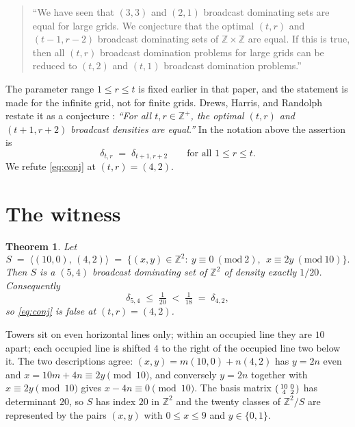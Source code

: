 \documentclass[11pt]{amsart}
\newtheorem{theorem}{Theorem}
\theoremstyle{remark}
\newcommand{\ZZ}{\mathbb{Z}}
\newcommand{\dens}{\delta}
\begin{document}
\begin{quote}
``We have seen that $(3,3)$ and $(2,1)$ broadcast dominating sets are equal for
large grids. We conjecture that the optimal $(t,r)$ and $(t-1,r-2)$ broadcast
dominating sets of $\ZZ\times\ZZ$ are equal. If this is true, then all $(t,r)$
broadcast domination problems for large grids can be reduced to $(t,2)$ and
$(t,1)$ broadcast domination problems.''
\end{quote}

\noindent
The parameter range $1\le r\le t$ is fixed earlier in that paper, and the
statement is made for the infinite grid, not for finite grids. Drews, Harris,
and Randolph restate it as a conjecture \cite{DHR}:
\emph{``For all $t,r\in\ZZ^+$, the optimal $(t,r)$ and $(t+1,r+2)$ broadcast
densities are equal.''} In the notation above the assertion is
\begin{equation}\label{eq:conj}
 \dens_{t,r}\;=\;\dens_{t+1,r+2}
 \qquad\text{for all } 1\le r\le t .
\end{equation}
We refute \eqref{eq:conj} at $(t,r)=(4,2)$.

\section{The witness}

\begin{theorem}\label{thm:main}
Let
\[
 S\;=\;\bigl\langle(10,0),\,(4,2)\bigr\rangle
   \;=\;\bigl\{(x,y)\in\ZZ^2:\ y\equiv0\ (\mathrm{mod}\ 2),\
        \ x\equiv2y\ (\mathrm{mod}\ 10)\bigr\}.
\]
Then $S$ is a $(5,4)$ broadcast dominating set of $\ZZ^2$ of density exactly
$1/20$. Consequently
\[
 \dens_{5,4}\;\le\;\tfrac1{20}\;<\;\tfrac1{18}\;=\;\dens_{4,2},
\]
so \eqref{eq:conj} is false at $(t,r)=(4,2)$.
\end{theorem}

Towers sit on even horizontal lines only; within an occupied line they are $10$
apart; each occupied line is shifted $4$ to the right of the occupied line two
below it. The two descriptions agree: $(x,y)=m(10,0)+n(4,2)$ has $y=2n$ even and
$x=10m+4n\equiv 2y\pmod{10}$, and conversely $y=2n$ together with
$x\equiv2y\pmod{10}$ gives $x-4n\equiv0\pmod{10}$. The basis matrix
$\begin{psmallmatrix}10&0\\4&2\end{psmallmatrix}$ has determinant $20$, so $S$
has index $20$ in $\ZZ^2$ and the twenty classes of $\ZZ^2/S$ are represented by
the pairs $(x,y)$ with $0\le x\le9$ and $y\in\{0,1\}$.
\end{document}
